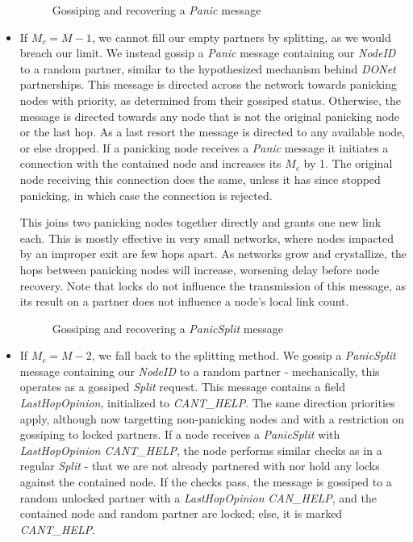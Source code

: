 \documentclass[12pt,a4paper]{article}
\begin{document}
\begin{itemize}
	\begin{figure}[!ht]
		\centering
		\resizebox{0.8\textwidth}{!}{%
			
		}%
		\caption{Gossiping and recovering a \textit{Panic} message}
		\label{panic}
	\end{figure}
	\item If \(M_c = M - 1\), we cannot fill our empty partners by splitting, as we would breach our limit. We instead gossip a 
	\textit{Panic} message containing our \textit{NodeID} to a random partner, similar to the hypothesized mechanism behind \textit{DONet} partnerships. This message is directed across the network towards panicking nodes with priority, as determined from their gossiped status. Otherwise, the message is directed towards any node that is not the original panicking node or the last hop. As a last resort the message is directed to any available node, or else dropped. If a panicking node receives a \textit{Panic} message it initiates a connection with the contained node and increases its \(M_c\) by 1. The original node receiving this connection does the same, unless it has since stopped panicking, in which case the connection is rejected.
	
	This joins two panicking nodes together directly and grants one new link each. This is mostly effective in very small networks, where nodes impacted by an improper exit are few hops apart. As networks grow and crystallize, the hops between panicking nodes will increase, worsening delay before node recovery. Note that locks do not influence the transmission of this message, as its result on a partner does not influence a node's local link count.
	
	\begin{figure}[!ht]
		\centering
		\resizebox{0.8\textwidth}{!}{%
			
		}%
		\caption{Gossiping and recovering a \textit{PanicSplit} message}
		\label{panic}
	\end{figure}
	
	\item If \(M_c = M - 2\), we fall back to the splitting method. We gossip a \textit{PanicSplit} message containing our \textit{NodeID} to a random partner - mechanically, this operates as a gossiped \textit{Split} request. This message contains a field \textit{LastHopOpinion}, initialized to \textit{CANT\_HELP}. The same direction priorities apply, although now targetting non-panicking nodes and with a restriction on gossiping to locked partners. If a node receives a \textit{PanicSplit} with \textit{LastHopOpinion CANT\_HELP}, the node performs similar checks as in a regular \textit{Split} - that we are not already partnered with nor hold any locks against the contained node. If the checks pass, the message is gossiped to a random unlocked partner with a \textit{LastHopOpinion} \textit{CAN\_HELP}, and the contained node and random partner are locked; else, it is marked \textit{CANT\_HELP}.
	

\end{itemize}
\end{document}

